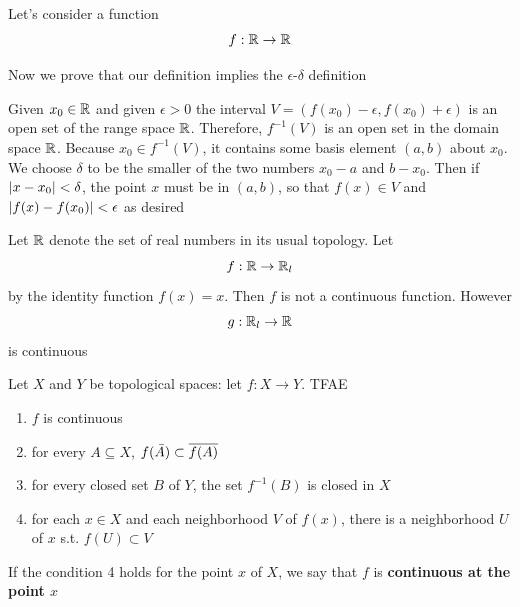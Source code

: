 \documentclass[11pt]{article}
\begin{document}
\begin{examplle}[]
Let's consider a function
\begin{equation*}
f:\mathbb{R}\to\mathbb{R}
\end{equation*}

Now we prove that our definition implies the \(\epsilon\)-\(\delta\) definition

Given \(x_0\in\mathbb{R}\)  and given \(\epsilon>0\) the interval \(V=(f(x_0)-\epsilon,f(x_0)+\epsilon)\) is an open set of the
range space \(\mathbb{R}\). Therefore, \(f^{-1}(V)\) is an open set in the domain space \(\mathbb{R}\).
Because \(x_0\in f^{-1}(V)\), it contains some basis element \((a,b)\) about \(x_0\). We choose
\(\delta\) to be the smaller of the two numbers \(x_0-a\) and \(b-x_0\). Then if \(\abs{x-x_0}<\delta\), the
point \(x\) must be in \((a,b)\), so that \(f(x)\in V\) and \(\abs{f(x)-f(x_0)}<\epsilon\) as desired
\end{examplle}

\begin{examplle}[]
Let \(\mathbb{R}\) denote the set of real numbers in its usual topology. Let
\begin{equation*}
f:\mathbb{R}\to\mathbb{R}_l
\end{equation*}
by the identity function \(f(x)=x\). Then \(f\) is not a continuous function. However
\begin{equation*}
g:\mathbb{R}_l\to\mathbb{R}
\end{equation*}
is continuous
\end{examplle}

\begin{theorem}[]
Let \(X\) and \(Y\) be topological spaces: let \(f:X\to Y\). TFAE
\begin{enumerate}
\item \(f\) is continuous
\item for every \(A\subseteq X\), \(f(\bar{A})\subset\overline{f(A)}\)
\item for every closed set \(B\) of \(Y\), the set \(f^{-1}(B)\) is closed in \(X\)
\item for each \(x\in X\) and each neighborhood \(V\) of \(f(x)\), there is a neighborhood \(U\)
of \(x\) s.t. \(f(U)\subset V\)
\end{enumerate}


If the condition 4 holds for the point \(x\) of \(X\), we say that \(f\) is \textbf{continuous at the
point \(x\)}
\end{theorem}
\end{document}
